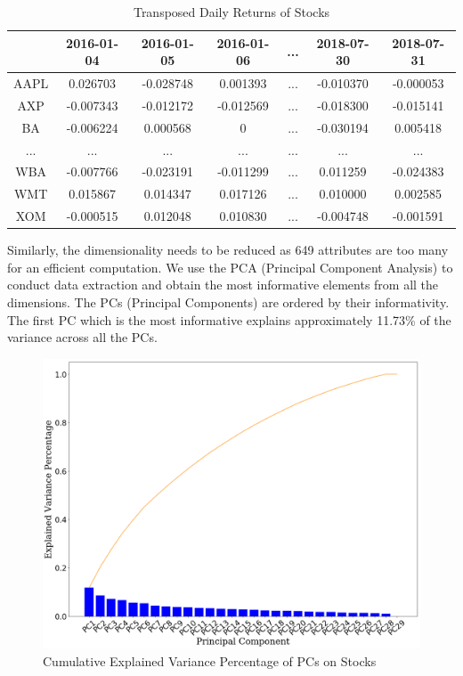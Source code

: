 \documentclass[11pt]{article} %
\theoremstyle{plain}
\theoremstyle{definition}
\begin{document}
{
  \begin{table}[ht]
    \centering
    \scriptsize
    \begin{tabular}{|c|c c c c c c|}
      \hline
       & 2016-01-04 & 2016-01-05 & 2016-01-06 & ... & 2018-07-30 & 2018-07-31 \\ [0.5ex]
      \hline
      AAPL & 0.026703 & -0.028748 & 0.001393 & ... & -0.010370 & -0.000053 \\
      \hline
      AXP & -0.007343 & -0.012172 & -0.012569 & ... & -0.018300 & -0.015141 \\
      \hline
      BA & -0.006224 & 0.000568 & 0 & ... & -0.030194 & 0.005418 \\
      \hline
      ... & ... & ... & ... & ... & ... & ... \\
      \hline
      WBA & -0.007766 & -0.023191 & -0.011299 & ... & 0.011259 & -0.024383 \\
      \hline
      WMT & 0.015867 & 0.014347 & 0.017126 & ... & 0.010000 & 0.002585 \\
      \hline
      XOM & -0.000515 & 0.012048 & 0.010830 & ... & -0.004748 & -0.001591 \\
      \hline
    \end{tabular}
    \caption{Transposed Daily Returns of Stocks}
    \label{table:tpstock}
  \end{table}
}

Similarly, the dimensionality needs to be reduced as 649 attributes are too many for an efficient computation. We use the PCA (Principal Component Analysis) to conduct data extraction and obtain the most informative elements from all the dimensions. The PCs (Principal Components) are ordered by their informativity. The first PC which is the most informative explains approximately 11.73\% of the variance across all the PCs.

\begin{figure}[ht]
    \includegraphics[width=1\linewidth, center]{resources/stock_pca_explained.png}
    \caption{Cumulative Explained Variance Percentage of PCs on Stocks}
    \label{fig:stockpca}
\end{figure}
\end{document}
